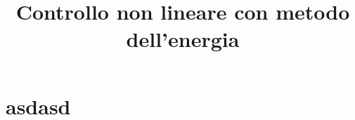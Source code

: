 \title{Controllo non lineare con metodo dell'energia}

\maketitle
\label{sec:system}



\section{asdasd}

